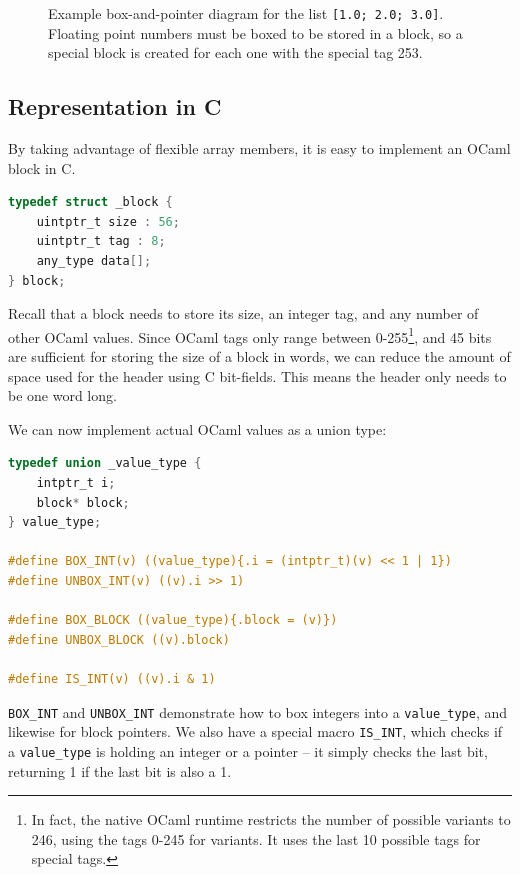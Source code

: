 \begin{figure}
    \centering
    
    \caption{Example box-and-pointer diagram for the list \texttt{[1.0; 2.0;
        3.0]}. Floating point numbers must be boxed to be stored in a block, so
        a special block is created for each one with the special tag 253.}
    \label{fig:block-example}
\end{figure}

\subsection{Representation in C} \label{c-repr}

By taking advantage of flexible array members, it is easy to implement an OCaml 
block in C.

\begin{lstlisting}[language=C]
typedef struct _block {
    uintptr_t size : 56;
    uintptr_t tag : 8;
    any_type data[];
} block;
\end{lstlisting}

Recall that a block needs to store its size, an integer tag, and any number of
other OCaml values. Since OCaml tags only range between 0-255\footnote{In fact,
    the native OCaml runtime restricts the number of possible variants to 246,
    using the tags 0-245 for variants. It uses the last 10 possible tags for
special tags.}, and 45 bits are sufficient for storing the size of a block in
words, we can reduce the amount of space used for the header using C bit-fields.
This means the header only needs to be one word long.

We can now implement actual OCaml values as a union type:

\begin{lstlisting}[language=C]
typedef union _value_type {
    intptr_t i;
    block* block;
} value_type;

#define BOX_INT(v) ((value_type){.i = (intptr_t)(v) << 1 | 1})
#define UNBOX_INT(v) ((v).i >> 1)

#define BOX_BLOCK ((value_type){.block = (v)})
#define UNBOX_BLOCK ((v).block)

#define IS_INT(v) ((v).i & 1)
\end{lstlisting}

\verb|BOX_INT| and \verb|UNBOX_INT| demonstrate how to box integers into a 
\verb|value_type|, and likewise for block pointers. We also have a special 
macro \verb|IS_INT|, which checks if a \verb|value_type| is holding an integer 
or a pointer -- it simply checks the last bit, returning 1 if the last bit is 
also a 1.

